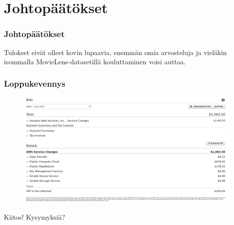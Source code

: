 \documentclass{beamer}
\begin{document}

\section{Johtopäätökset}

\begin{frame}
\frametitle{Johtopäätökset}

Tulokset eivät olleet kovin lupaavia, enemmän omia arvosteluja ja vieläkin isommalla MovieLens-datasetillä kouluttaminen voisi auttaa.

\end{frame}


\begin{frame}
\frametitle{Loppukevennys}

\begin{figure}[h]
	\centering
	\includegraphics[scale=0.2]{../images/aws_bill}
\end{figure}

\end{frame}


\begin{frame}

Kiitos! Kysymyksiä?

\end{frame}

\end{document}
